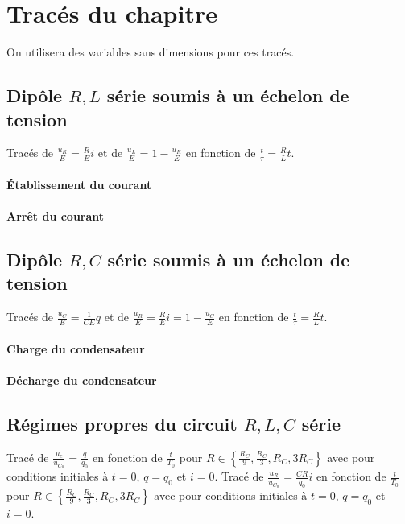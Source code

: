 \section{Tracés du chapitre}
On utilisera des variables sans dimensions pour ces tracés.
\subsection{Dipôle \(R, L\) série soumis à un échelon de tension}
Tracés de \(\frac{u_R}{E} = \frac{R}{E} i\) et de \(\frac{u_L}{E} = 1- \frac{u_R}{E}\) en fonction de \(\frac{t}{\tau} = \frac{R}{L} t\).
\paragraph{Établissement du courant}

\paragraph{Arrêt du courant}

\subsection{Dipôle \(R, C\) série soumis à un échelon de tension}
Tracés de \(\frac{u_C}{E} = \frac{1}{CE} q\) et de \(\frac{u_R}{E} = \frac{R}{E} i = 1- \frac{u_C}{E}\) en fonction de \(\frac{t}{\tau} = \frac{R}{L} t\).
\paragraph{Charge du condensateur}

\paragraph{Décharge du condensateur}

\subsection{Régimes propres du circuit \(R, L, C\) série}\label{sec:regpropresRLC}
Tracé de \(\frac{u_c}{u_{C_0}} = \frac{q}{q_0}\) en fonction de \(\frac{t}{T_0}\) pour \(R \in \left\{\frac{R_C}{9}, \frac{R_C}{3}, R_C, 3R_C \right\}\) avec pour conditions initiales à \(t=0\), \(q=q_0\) et \(i=0\).
Tracé de \(\frac{u_R}{u_{C_0}} = \frac{CR}{q_0} i\) en fonction de \(\frac{t}{T_0}\) pour \(R \in \left\{\frac{R_C}{9}, \frac{R_C}{3}, R_C, 3R_C \right\}\) avec pour conditions initiales à \(t=0\), \(q=q_0\) et \(i=0\).
